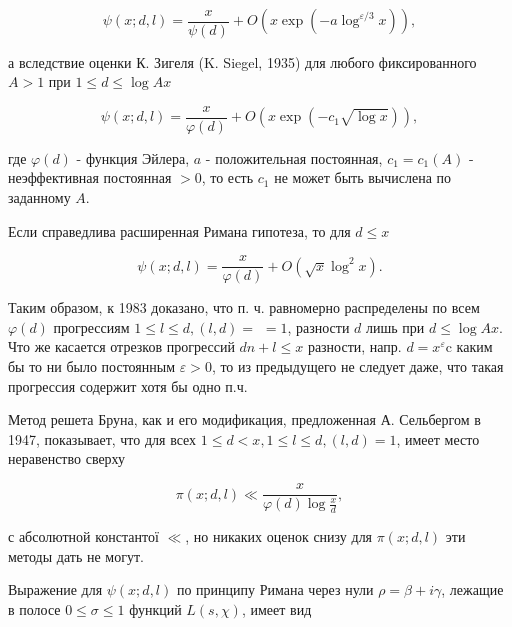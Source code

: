 \documentclass[10pt]{article}
\begin{document}
\[

\psi(x ; d, l)=\frac{x}{\psi(d)}+O\left(x \exp \left(-a \log ^{\varepsilon / 3} x\right)\right),

\]



а вследствие оценки К. Зигеля (K. Siegel, 1935) для любого фиксированного $A>1$ при $1 \leqslant d \leqslant \log A x$



\[

\psi(x ; d, l)=\frac{x}{\varphi(d)}+O\left(x \exp \left(-c_{1} \sqrt{\log x}\right)\right),

\]



где $\varphi(d)$ - функция Эйлера, $a$ - положительная постоянная, $c_{1}=c_{1}(A)$ - неэффективная постоянная $>0$, то есть $c_{1}$ не может быть вычислена по заданному $A$.



Если справедлива расширенная Римана гипотеза, то для $d \leqslant x$



\[

\psi(x ; d, l)=\frac{x}{\varphi(d)}+O\left(\sqrt{x} \log ^{2} x\right) .

\]



Таким образом, к 1983 доказано, что п. ч. равномерно распределены по всем $\varphi(d)$ прогрессиям $1 \leqslant l \leqslant d,(l, d)=$ $=1$, разности $d$ лишь при $d \leqslant \log A x$. Что же касается отрезков прогрессий $d n+l \leqslant x$ разности, напр. $d=x^{\varepsilon} \mathrm{c}$ каким бы то ни было постоянным $\varepsilon>0$, то из предыдущего не следует даже, что такая прогрессия содержит хотя бы одно п.ч.



Метод решета Бруна, как и его модификация, предложенная А. Сельбергом в 1947, показывает, что для всех $1 \leqslant d<x, 1 \leqslant l \leqslant d,(l, d)=1$, имеет место неравенство сверху



\[

\pi(x ; d, l) \ll \frac{x}{\varphi(d) \log \frac{x}{d}},

\]



с абсолютной константої $\ll$, но никаких оценок снизу для $\pi(x ; d, l)$ эти методы дать не могут.



Выражение для $\psi(x ; d, l)$ по принципу Римана через нули $\rho=\beta+i \gamma$, лежащие в полосе $0 \leqslant \sigma \leqslant 1$ функций $L(s, \chi)$, имеет вид
\end{document}

